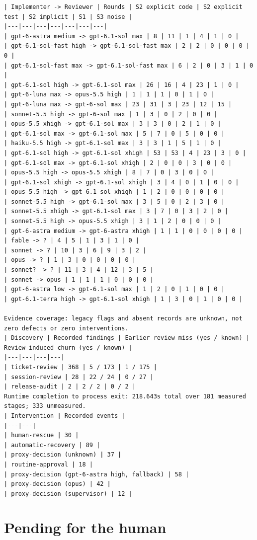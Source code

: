 \documentclass[11pt,a4paper]{article}
\begin{document}
{\begin{verbatim}
| Implementer -> Reviewer | Rounds | S2 explicit code | S2 explicit test | S2 implicit | S1 | S3 noise |
|---|---|---|---|---|---|---|
| gpt-6-astra medium -> gpt-6.1-sol max | 8 | 11 | 1 | 4 | 1 | 0 |
| gpt-6.1-sol-fast high -> gpt-6.1-sol-fast max | 2 | 2 | 0 | 0 | 0 | 0 |
| gpt-6.1-sol-fast max -> gpt-6.1-sol-fast max | 6 | 2 | 0 | 3 | 1 | 0 |
| gpt-6.1-sol high -> gpt-6.1-sol max | 26 | 16 | 4 | 23 | 1 | 0 |
| gpt-6-luna max -> opus-5.5 high | 1 | 1 | 1 | 0 | 1 | 0 |
| gpt-6-luna max -> gpt-6-sol max | 23 | 31 | 3 | 23 | 12 | 15 |
| sonnet-5.5 high -> gpt-6-sol max | 1 | 3 | 0 | 2 | 0 | 0 |
| opus-5.5 xhigh -> gpt-6.1-sol max | 3 | 3 | 0 | 2 | 1 | 0 |
| gpt-6.1-sol max -> gpt-6.1-sol max | 5 | 7 | 0 | 5 | 0 | 0 |
| haiku-5.5 high -> gpt-6.1-sol max | 3 | 3 | 1 | 5 | 1 | 0 |
| gpt-6.1-sol high -> gpt-6.1-sol xhigh | 53 | 53 | 4 | 23 | 3 | 0 |
| gpt-6.1-sol max -> gpt-6.1-sol xhigh | 2 | 0 | 0 | 3 | 0 | 0 |
| opus-5.5 high -> opus-5.5 xhigh | 8 | 7 | 0 | 3 | 0 | 0 |
| gpt-6.1-sol xhigh -> gpt-6.1-sol xhigh | 3 | 4 | 0 | 1 | 0 | 0 |
| opus-5.5 high -> gpt-6.1-sol xhigh | 1 | 2 | 0 | 0 | 0 | 0 |
| sonnet-5.5 high -> gpt-6.1-sol max | 3 | 5 | 0 | 2 | 3 | 0 |
| sonnet-5.5 xhigh -> gpt-6.1-sol max | 3 | 7 | 0 | 3 | 2 | 0 |
| sonnet-5.5 high -> opus-5.5 xhigh | 3 | 1 | 2 | 0 | 0 | 0 |
| gpt-6-astra medium -> gpt-6-astra xhigh | 1 | 1 | 0 | 0 | 0 | 0 |
| fable -> ? | 4 | 5 | 1 | 3 | 1 | 0 |
| sonnet -> ? | 10 | 3 | 6 | 9 | 3 | 2 |
| opus -> ? | 1 | 3 | 0 | 0 | 0 | 0 |
| sonnet? -> ? | 11 | 3 | 4 | 12 | 3 | 5 |
| sonnet -> opus | 1 | 1 | 1 | 0 | 0 | 0 |
| gpt-6-astra low -> gpt-6.1-sol max | 1 | 2 | 0 | 1 | 0 | 0 |
| gpt-6.1-terra high -> gpt-6.1-sol xhigh | 1 | 3 | 0 | 1 | 0 | 0 |

Evidence coverage: legacy flags and absent records are unknown, not zero defects or zero interventions.
| Discovery | Recorded findings | Earlier review miss (yes / known) | Review-induced churn (yes / known) |
|---|---|---|---|
| ticket-review | 368 | 5 / 173 | 1 / 175 |
| session-review | 28 | 22 / 24 | 0 / 27 |
| release-audit | 2 | 2 / 2 | 0 / 2 |
Runtime completion to process exit: 218.643s total over 181 measured stages; 333 unmeasured.
| Intervention | Recorded events |
|---|---|
| human-rescue | 30 |
| automatic-recovery | 89 |
| proxy-decision (unknown) | 37 |
| routine-approval | 18 |
| proxy-decision (gpt-6-astra high, fallback) | 58 |
| proxy-decision (opus) | 42 |
| proxy-decision (supervisor) | 12 |
\end{verbatim}
}

\section*{Pending for the human}
\end{document}
